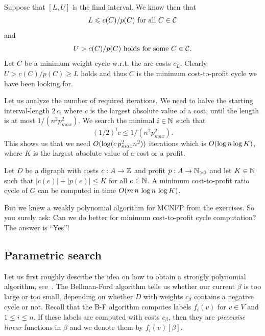 Suppose that $[L,U]$ is the final interval. 
We know then that 
\begin{displaymath}
  L \leqslant c(C) / p(C) \text{ for all } C \in \mathcal{C} 
\end{displaymath}
and 
\begin{displaymath}
  U> c(C)/p(C) \text{ holds for some } C \in \mathcal{C}. 
\end{displaymath}
Let $C$ be a minimum weight cycle w.r.t. the arc costs $c_L$. Clearly
$ U > c(C)/p(C) \geq L$ holds and thus $C$ is the minimum cost-to-profit
cycle we have been looking for. 

Let us analyze the number of required iterations. We need to halve the
starting interval-length $2 \, c$, where $c$ is the largest absolute
value of a cost, until the length is at most $1/ (n^2 p_{max}^2)$. 
We search the minimal $i\in \mathbb{N}$ such that
\begin{equation}
  \label{f:eq:35}
  (1/2)^i c \leq 1/(n^2 p_{max}^2).
\end{equation}
This shows us that we need $O(\log( c \,p_{max}^2 n^2))$
iterations which is $O(\log n \log K)$, where $K$ is the largest
absolute value of a cost or a profit. 



\begin{theorem}
  \label{f:thr:15}
  Let $D$ be a digraph  with costs $c:A\to\mathbb{Z}$ and profit $p: A\to \mathbb{N}_{>0}$
  and let $K \in \mathbb{N}$   such that $|c(e)| + |p(e)| \leq K$ for all $e \in \mathbb{N}$. A
  minimum cost-to-profit ratio cycle of $G$ can be computed in time
  $O(m\,n \, \log n\, \log K)$.
\end{theorem}



But we knew a weakly polynomial algorithm for MCNFP from the
exercises. So you surely ask: Can we do better for minimum
cost-to-profit cycle computation? The answer is ``Yes''!



\subsection{Parametric search} 
\label{sec:parametric-search}




Let us first roughly describe  the  idea on  how to obtain a
strongly polynomial algorithm, see~\cite{Megiddo79}.  The Bellman-Ford
algorithm tells us whether our  current $\beta$ is too large or too
small, depending on whether $D$ with weights $c_\beta$ contains a
negative cycle or not. Recall that the B-F algorithm computes labels
$f_i(v)$ for $v \in V$ and $1\leq i\leq n$.  If these labels are computed
with costs $c_\beta$, then they are \emph{piecewise linear} functions in
$\beta$ and we denote them by $f_i(v)[\beta]$. 

